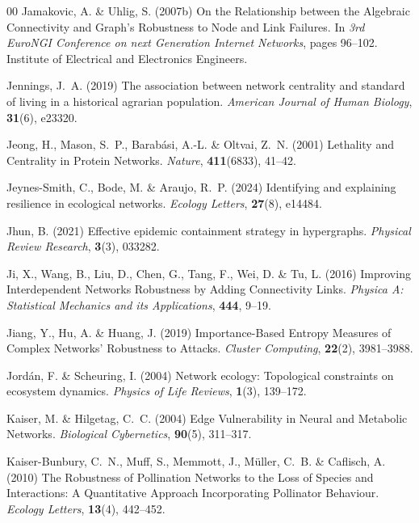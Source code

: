 \documentclass{comnet-mod}
\begin{document}
\begin{thebibliography}{00}
Jamakovic, A. {\&} Uhlig, S. (2007b)  {On the Relationship between the
  Algebraic Connectivity and Graph's Robustness to Node and Link Failures}. In
  {\em {3rd {{EuroNGI}} Conference on next Generation Internet Networks}},
  pages 96--102. {Institute of Electrical and Electronics Engineers}.

Jennings, J.~A. (2019)  The association between network centrality and standard
  of living in a historical agrarian population. {\em {American Journal of
  Human Biology}}, \textbf{31}(6), e23320.

Jeong, H., Mason, S.~P., Barab{\'a}si, A.-L. {\&} Oltvai, Z.~N. (2001)
  {Lethality and Centrality in Protein Networks}. {\em {Nature}},
  \textbf{411}(6833), 41--42.

Jeynes-Smith, C., Bode, M. {\&} Araujo, R.~P. (2024)  Identifying and
  explaining resilience in ecological networks. {\em {Ecology Letters}},
  \textbf{27}(8), e14484.

Jhun, B. (2021)  Effective epidemic containment strategy in hypergraphs. {\em
  {Physical Review Research}}, \textbf{3}(3), 033282.

Ji, X., Wang, B., Liu, D., Chen, G., Tang, F., Wei, D. {\&} Tu, L. (2016)
  {Improving Interdependent Networks Robustness by Adding Connectivity Links}.
  {\em {Physica A: Statistical Mechanics and its Applications}}, \textbf{444},
  9--19.

Jiang, Y., Hu, A. {\&} Huang, J. (2019)  {Importance-Based Entropy Measures of
  Complex Networks' Robustness to Attacks}. {\em {Cluster Computing}},
  \textbf{22}(2), 3981--3988.

Jord{\'a}n, F. {\&} Scheuring, I. (2004)  Network ecology: {T}opological
  constraints on ecosystem dynamics. {\em {Physics of Life Reviews}},
  \textbf{1}(3), 139--172.

Kaiser, M. {\&} Hilgetag, C.~C. (2004)  {Edge Vulnerability in Neural and
  Metabolic Networks}. {\em {Biological Cybernetics}}, \textbf{90}(5),
  311--317.

{Kaiser-Bunbury}, C.~N., Muff, S., Memmott, J., M{\"u}ller, C.~B. {\&}
  Caflisch, A. (2010)  {The Robustness of Pollination Networks to the Loss of
  Species and Interactions: {{A}} Quantitative Approach Incorporating
  Pollinator Behaviour}. {\em {Ecology Letters}}, \textbf{13}(4), 442--452.


\end{thebibliography}
\end{document}

